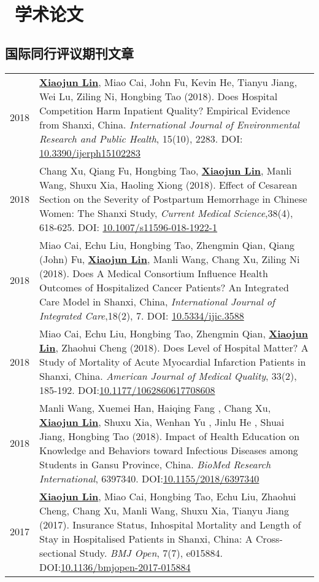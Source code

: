 \documentclass{resume}
\begin{document}
\section{\faFileTextO\ 学术论文}
\subsection*{\textbf{国际同行评议期刊文章}}
\begin{longtable}{r p{14cm}}
2018 & \underline{\textbf{Xiaojun Lin}}, Miao Cai, John Fu, Kevin He, Tianyu Jiang, Wei Lu, Ziling Ni, Hongbing Tao (2018). Does Hospital Competition Harm Inpatient Quality? Empirical Evidence from Shanxi, China. \emph{ International Journal of Environmental Research and Public Health}, 15(10), 2283. DOI: \href{https://doi.org/10.3390/ijerph15102283}{10.3390/ijerph15102283}\\
2018 & Chang Xu, Qiang Fu, Hongbing Tao, \underline{\textbf{Xiaojun Lin}}, Manli Wang, Shuxu Xia, Haoling Xiong (2018). Effect of Cesarean Section on the Severity of Postpartum Hemorrhage in Chinese Women: The Shanxi Study, \emph{ Current Medical Science},38(4), 618-625. DOI: \href{https://doi.org/10.1007/s11596-018-1922-1}{10.1007/s11596-018-1922-1}\\
2018 & Miao Cai, Echu Liu, Hongbing Tao, Zhengmin Qian, Qiang (John) Fu, \underline{\textbf{Xiaojun Lin}}, Manli Wang, Chang Xu, Ziling Ni (2018). Does A Medical Consortium Influence Health Outcomes of Hospitalized Cancer Patients? An Integrated Care Model in Shanxi, China, \emph{ International Journal of Integrated Care},18(2), 7. DOI: \href{https://doi.org/10.5334/ijic.3588}{10.5334/ijic.3588}\\ 
2018 & Miao Cai, Echu Liu, Hongbing Tao, Zhengmin Qian, \underline{\textbf{Xiaojun Lin}}, Zhaohui Cheng (2018). Does Level of Hospital Matter? A Study of Mortality of Acute Myocardial Infarction Patients in Shanxi, China. \emph{ American Journal of Medical Quality}, 33(2), 185-192. DOI:\href{https://doi.org/10.1177/1062860617708608}{10.1177/1062860617708608}\\ 
2018 & Manli Wang, Xuemei Han, Haiqing Fang , Chang Xu, \underline{\textbf{Xiaojun Lin}}, Shuxu Xia, Wenhan Yu , Jinlu He , Shuai Jiang, Hongbing Tao (2018). Impact of Health Education on Knowledge and Behaviors toward Infectious Diseases among Students in Gansu Province, China. \emph{BioMed Research International}, 6397340. DOI:\href{https://doi.org/10.1155/2018/6397340}{10.1155/2018/6397340} \\
2017 &  \underline{\textbf{Xiaojun Lin}}, Miao Cai, Hongbing Tao, Echu Liu, Zhaohui Cheng, Chang Xu, Manli Wang, Shuxu Xia, Tianyu Jiang (2017). Insurance Status, Inhospital Mortality and Length of Stay in Hospitalised Patients in Shanxi, China: A Cross-sectional Study. \emph{ BMJ Open}, 7(7), e015884. DOI:\href{https://doi.org/10.1136/bmjopen-2017-015884}{10.1136/bmjopen-2017-015884}\\

\end{longtable}
\end{document}
